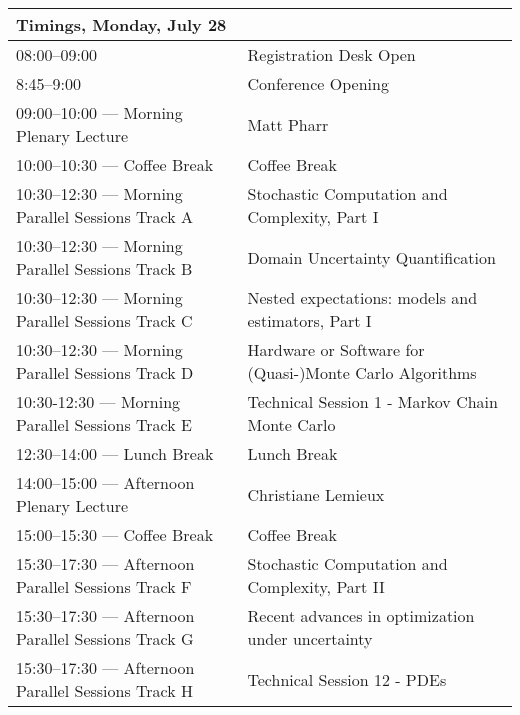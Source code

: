 \begin{sideways}
\begin{tabular}{l|l}
\hline
\large\textbf{Timings, Monday, 
 July 28} & \large\textbf{} \\
\hline
\cellcolor{\EmptyColor}08:00–09:00 & \cellcolor{\EmptyColor}Registration Desk Open \\
\cellcolor{\EmptyColor}8:45–9:00 & \cellcolor{\EmptyColor}Conference Opening \\
\cellcolor{\PlenaryColor}09:00–10:00 — Morning Plenary Lecture & \cellcolor{\PlenaryColor}Matt Pharr \\
\cellcolor{\EmptyColor}10:00–10:30 — Coffee Break & \cellcolor{\EmptyColor}Coffee Break \\
\cellcolor{\SessionTitleColor}10:30–12:30 — Morning Parallel Sessions Track A & \cellcolor{\SessionTitleColor}Stochastic Computation and Complexity, Part I \\
\cellcolor{\SessionTitleColor}10:30–12:30 — Morning Parallel Sessions Track B & \cellcolor{\SessionTitleColor}Domain Uncertainty Quantification \\
\cellcolor{\SessionTitleColor}10:30–12:30 — Morning Parallel Sessions Track C & \cellcolor{\SessionTitleColor}Nested expectations: models and estimators, Part I \\
\cellcolor{\SessionTitleColor}10:30–12:30 — Morning Parallel Sessions Track D & \cellcolor{\SessionTitleColor}Hardware or Software for (Quasi-)Monte Carlo Algorithms \\
\cellcolor{\SessionLightColor}10:30-12:30 — Morning Parallel Sessions Track E & \cellcolor{\SessionLightColor}Technical Session 1 - Markov Chain Monte Carlo \\
\cellcolor{\EmptyColor}12:30–14:00 — Lunch Break & \cellcolor{\EmptyColor}Lunch Break \\
\cellcolor{\PlenaryColor}14:00–15:00 — Afternoon Plenary Lecture & \cellcolor{\PlenaryColor}Christiane Lemieux \\
\cellcolor{\EmptyColor}15:00–15:30 — Coffee Break & \cellcolor{\EmptyColor}Coffee Break \\
\cellcolor{\SessionTitleColor}15:30–17:30 — Afternoon Parallel Sessions Track F & \cellcolor{\SessionTitleColor}Stochastic Computation and Complexity, Part II \\
\cellcolor{\SessionTitleColor}15:30–17:30 — Afternoon Parallel Sessions Track G & \cellcolor{\SessionTitleColor}Recent advances in optimization under uncertainty \\
\cellcolor{\SessionLightColor}15:30–17:30 — Afternoon Parallel Sessions Track H & \cellcolor{\SessionLightColor}Technical Session 12 - PDEs \\

\end{tabular}
\end{sideways}
